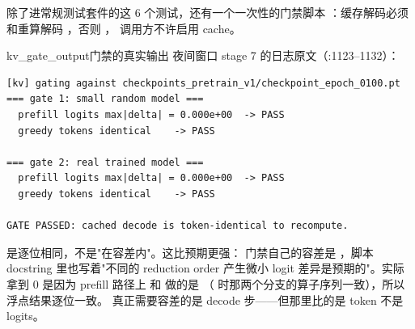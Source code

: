 除了进常规测试套件的这 6 个测试，还有一个一次性的门禁脚本
：缓存解码必须和重算解码
，否则 ，
调用方不许启用 cache。

\begin{examplebox}{kv_gate_output}{门禁的真实输出}
夜间窗口 stage 7 的日志原文（:1123--1132）：

\begin{lstlisting}[style=hlshell]
[kv] gating against checkpoints_pretrain_v1/checkpoint_epoch_0100.pt
=== gate 1: small random model ===
  prefill logits max|delta| = 0.000e+00  -> PASS
  greedy tokens identical    -> PASS

=== gate 2: real trained model ===
  prefill logits max|delta| = 0.000e+00  -> PASS
  greedy tokens identical    -> PASS

GATE PASSED: cached decode is token-identical to recompute.
\end{lstlisting}

 是逐位相同，不是"在容差内"。这比预期更强：
门禁自己的容差是 ，脚本 docstring 里也写着"不同的 reduction order
产生微小 logit 差异是预期的"。实际拿到 0 是因为 prefill 路径上
 和  做的是
（ 时那两个分支的算子序列一致），所以浮点结果逐位一致。
真正需要容差的是 decode 步——但那里比的是 token 不是 logits。
\end{examplebox}

